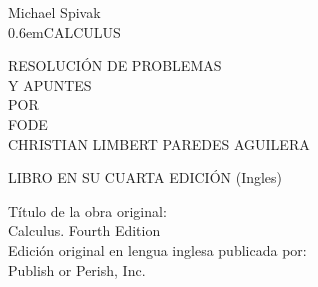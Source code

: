 \begin{titlingpage}

\newcommand\nbvspace[1][3]{\vspace*{\stretch{#1}}}
\newcommand\nbstretchyspace{\spaceskip0.5em plus 0.25em minus 0.25em}
\newcommand{\nbtitlestretch}{\spaceskip0.6em}
\pagestyle{empty}

\begin{center}
\bfseries
\nbvspace[1]

\Large  Michael Spivak\\
\Huge
{\nbtitlestretch\Huge CALCULUS}\\
\vspace{.5cm}
\large

\nbvspace[1]

RESOLUCIÓN DE PROBLEMAS\\
Y APUNTES\\

\nbvspace[1]
\small POR\\
\Large FODE\\[0.5em]
\footnotesize CHRISTIAN LIMBERT PAREDES AGUILERA\\

\nbvspace[2]

\begin{center}
\end{center}

\nbvspace[3]
\normalsize

LIBRO EN SU CUARTA EDICIÓN (Ingles)\\
\large
\nbvspace[1]

\end{center}

\break
\bfseries 

\nbvspace[1]
Título de la obra original:\\
Calculus. Fourth Edition\\
Edición original en lengua inglesa publicada por:\\
Publish or Perish, Inc.\\


\end{titlingpage}
